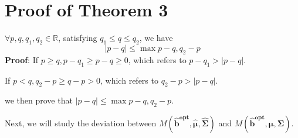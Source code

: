 \documentclass{gapd}
\begin{document}
\section{Proof of Theorem 3}
\begin{lemma}
$\forall p,q,q_1,q_2 \in \mathbb{R}$, satisfying $q_1 \le q \le q_2$, we have
$$|p-q| \le \max{p-q,q_2-p}$$
\textbf{Proof}: If $p \ge q, p-q_1 \ge p-q \ge 0$, which refers to $p-q_1 > |p-q|$.

If $p < q, q_2-p \ge q-p > 0$, which refers to $q_2-p > |p-q|$.

we then prove that $|p-q| \le \max{p-q,q_2-p}$.
\end{lemma}

Next, we will study the deviation between $M(\mathbf{\hat{b}^{opt}},\boldsymbol{\hat{\mu}},\boldsymbol{\hat{\Sigma}})$ and $M(\mathbf{\hat{b}^{opt}},\boldsymbol{\mu},\boldsymbol{\Sigma})$.
\end{document}
